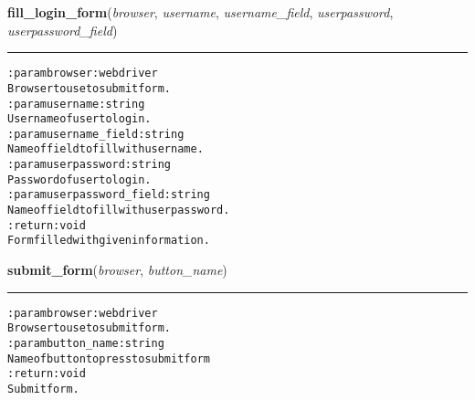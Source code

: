 \hspace{.8\funcindent}\begin{boxedminipage}{\funcwidth}

    \raggedright \textbf{fill\_login\_form}(\textit{browser}, \textit{username}, \textit{username\_field}, \textit{userpassword}, \textit{userpassword\_field})

    \vspace{-1.5ex}

    \rule{\textwidth}{0.5\fboxrule}
\setlength{\parskip}{2ex}
\begin{alltt}

:param browser: webdriver
    Browser to use to submit form.
:param username: string
    Username of user to login.
:param username\_field: string
    Name of field to fill with username.
:param userpassword: string
    Password of user to login.
:param userpassword\_field: string
    Name of field to fill with userpassword.
:return: void
    Form filled with given information.
\end{alltt}

\setlength{\parskip}{1ex}
    \end{boxedminipage}

    \label{hal:internet:selenium:SeleniumForm:submit_form}

    \vspace{0.5ex}

\hspace{.8\funcindent}\begin{boxedminipage}{\funcwidth}

    \raggedright \textbf{submit\_form}(\textit{browser}, \textit{button\_name})

    \vspace{-1.5ex}

    \rule{\textwidth}{0.5\fboxrule}
\setlength{\parskip}{2ex}
\begin{alltt}

:param browser: webdriver
    Browser to use to submit form.
:param button\_name: string
    Name of button to press to submit form
:return: void
    Submit form.
\end{alltt}

\setlength{\parskip}{1ex}
    \end{boxedminipage}

